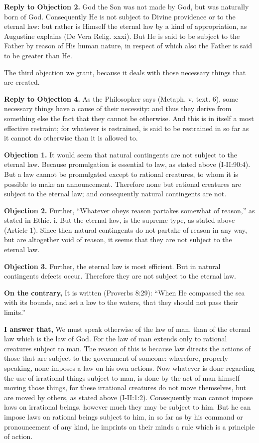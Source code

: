 \textbf{Reply to Objection 2.} God the Son was not made by God, but was naturally born of God. Consequently He is not subject to Divine providence or to the eternal law: but rather is Himself the eternal law by a kind of appropriation, as Augustine explains (De Vera Relig. xxxi). But He is said to be subject to the Father by reason of His human nature, in respect of which also the Father is said to be greater than He.

The third objection we grant, because it deals with those necessary things that are created.

\textbf{Reply to Objection 4.} As the Philosopher says (Metaph. v, text. 6), some necessary things have a cause of their necessity: and thus they derive from something else the fact that they cannot be otherwise. And this is in itself a most effective restraint; for whatever is restrained, is said to be restrained in so far as it cannot do otherwise than it is allowed to.


\textbf{Objection 1.} It would seem that natural contingents are not subject to the eternal law. Because promulgation is essential to law, as stated above (I-II:90:4). But a law cannot be promulgated except to rational creatures, to whom it is possible to make an announcement. Therefore none but rational creatures are subject to the eternal law; and consequently natural contingents are not.

\textbf{Objection 2.} Further, ``Whatever obeys reason partakes somewhat of reason,'' as stated in Ethic. i. But the eternal law, is the supreme type, as stated above (Article 1). Since then natural contingents do not partake of reason in any way, but are altogether void of reason, it seems that they are not subject to the eternal law.

\textbf{Objection 3.} Further, the eternal law is most efficient. But in natural contingents defects occur. Therefore they are not subject to the eternal law.

\textbf{On the contrary,} It is written (Proverbs 8:29): ``When He compassed the sea with its bounds, and set a law to the waters, that they should not pass their limits.''

\textbf{I answer that,} We must speak otherwise of the law of man, than of the eternal law which is the law of God. For the law of man extends only to rational creatures subject to man. The reason of this is because law directs the actions of those that are subject to the government of someone: wherefore, properly speaking, none imposes a law on his own actions. Now whatever is done regarding the use of irrational things subject to man, is done by the act of man himself moving those things, for these irrational creatures do not move themselves, but are moved by others, as stated above (I-II:1:2). Consequently man cannot impose laws on irrational beings, however much they may be subject to him. But he can impose laws on rational beings subject to him, in so far as by his command or pronouncement of any kind, he imprints on their minds a rule which is a principle of action.

